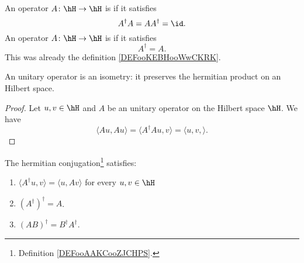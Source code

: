 \begin{definition}      \label{DEFooOKGXooFCzCHu}
    An operator \( A\colon \hH\to \hH\) is  if it satisfies
    \begin{equation}
        A^{\dag}A=AA^{\dag}=\id.
    \end{equation}
    An operator \( A\colon \hH\to \hH\) is  if it satisfies
    \begin{equation}
        A^{\dag}=A.
    \end{equation}
    This was already the definition \ref{DEFooKEBHooWwCKRK}.
\end{definition}

\begin{lemma}
    An unitary operator is an isometry: it preserves the hermitian product on an Hilbert space.
\end{lemma}

\begin{proof}
    Let \( u,v\in \hH\) and \( A\) be an unitary operator on the Hilbert space \( \hH\). We have
    \begin{equation}
        \langle Au, Au\rangle =\langle A^{\dag}Au, v\rangle =\langle u,v, \rangle .
    \end{equation}
\end{proof}

\begin{lemma}        \label{LEMooJYGRooPTMZwY}
    The hermitian conjugation\footnote{Definition \ref{DEFooAAKCooZJCHPS}.} satisfies:
    \begin{enumerate}
        \item
            \( \langle A^{\dag}u, v\rangle =\langle u, Av\rangle \) for every \( u,v\in \hH\)
        \item
            \( (A^{\dag})^{\dag}=A\).
        \item       \label{ITEMooULJLooAqnbHI}
            \( (AB)^{\dag}=B^{\dag}A^{\dag}\).
    \end{enumerate}
\end{lemma}

